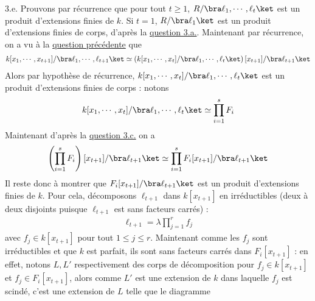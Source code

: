 \documentclass[11pt]{article}
\begin{document}
    \begin{question}{3.e.}
        Prouvons par récurrence que pour tout $t \geq 1$, $R/\bra \ell_1, \cdots, \ell_t \ket$ est un produit d'extensions finies de $k$. Si $t = 1$, $R/\bra \ell_1 \ket$ est un produit d'extensions finies de corps, d'après la \hyperref[q3a]{question 3.a.}. Maintenant par récurrence, on a vu à la \hyperref[q3d]{question précédente} que
        \begin{align*}
            k[x_1, \cdots, x_{t + 1}]/\bra \ell_1, \cdots, \ell_{t + 1} \ket \simeq \left(k[x_1, \cdots, x_t]/\bra \ell_1, \cdots, \ell_t \ket \right)[x_{t+1}]/\bra \ell_{t + 1} \ket
        \end{align*}
        Alors par hypothèse de récurrence, $k[x_1, \cdots, x_t]/\bra \ell_1, \cdots, \ell_t \ket$ est un produit d'extensions finies de corps : notons
        \begin{align*}
            k[x_1, \cdots, x_t]/\bra \ell_1, \cdots, \ell_t \ket \simeq \prod_{i = 1}^s F_i
        \end{align*}
        Maintenant d'après la \hyperref[q3c]{question 3.c.} on a
        \begin{align*}
            \left(\prod_{i = 1}^s F_i \right)[x_{t+1}]/\bra \ell_{t + 1} \ket \simeq \prod_{i = 1}^s F_i[x_{t+1}]/\bra \ell_{t + 1} \ket
        \end{align*}
        Il reste donc à montrer que $F_i[x_{t+1}]/\bra \ell_{t + 1} \ket$ est un produit d'extensions finies de $k$. Pour cela, décomposons $\ell_{t + 1}$ dans $k[x_{t + 1}]$ en irréductibles (deux à deux disjoints puisque $\ell_{t + 1}$ est sans facteurs carrés) :
        \begin{align*}
            \ell_{t + 1} = \lambda \prod_{j = 1}^r f_j
        \end{align*}
        avec $f_j \in k[x_{t + 1}]$ pour tout $1 \leq j \leq r$. Maintenant comme les $f_j$ sont irréductibles et que $k$ est parfait, ils sont sans facteurs carrés dans $F_i[x_{t + 1}]$ : en effet, notons $L,L'$ respectivement des corps de décomposition pour $f_j \in k[x_{t + 1}]$ et $f_j \in F_i[x_{t + 1}]$, alors comme $L'$ est une extension de $k$ dans laquelle $f_j$ est scindé, c'est une extension de $L$ telle que le diagramme
        \begin{figure}[H]
            \centering
\end{figure}
\end{question}
\end{document}
